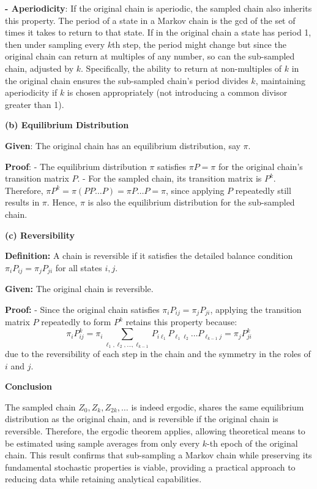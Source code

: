 \documentclass[8pt]{article}
\begin{document}
\textbf{- Aperiodicity}: If the original chain is aperiodic, the sampled chain also inherits this property. The period of a state in a Markov chain is the gcd of the set of times it takes to return to that state. If in the original chain a state has period 1, then under sampling every \(k\)th step, the period might change but since the original chain can return at multiples of any number, so can the sub-sampled chain, adjusted by \(k\). Specifically, the ability to return at non-multiples of \(k\) in the original chain ensures the sub-sampled chain's period divides \(k\), maintaining aperiodicity if \(k\) is chosen appropriately (not introducing a common divisor greater than 1).

\textbf{(b) Equilibrium Distribution}

\textbf{Given}: The original chain has an equilibrium distribution, say \(\pi\).

\textbf{Proof}:
- The equilibrium distribution \(\pi\) satisfies \(\pi P = \pi\) for the original chain's transition matrix \(P\).
- For the sampled chain, its transition matrix is \(P^k\). Therefore, \(\pi P^k = \pi (P P \ldots P) = \pi P \ldots P = \pi\), since applying \(P\) repeatedly still results in \(\pi\). Hence, \(\pi\) is also the equilibrium distribution for the sub-sampled chain.

\textbf{(c) Reversibility}

\textbf{Definition:} A chain is reversible if it satisfies the detailed balance condition \(\pi_i P_{ij} = \pi_j P_{ji}\) for all states \(i, j\).

\textbf{Given:} The original chain is reversible.

\textbf{Proof:}
- Since the original chain satisfies \(\pi_i P_{ij} = \pi_j P_{ji}\), applying the transition matrix \(P\) repeatedly to form \(P^k\) retains this property because:
  \[
  \pi_i P^k_{ij} = \pi_i \sum_{\ell_1, \ell_2, \ldots, \ell_{k-1}} P_{i\ell_1} P_{\ell_1\ell_2} \ldots P_{\ell_{k-1}j} = \pi_j P^k_{ji}
  \]
  due to the reversibility of each step in the chain and the symmetry in the roles of \(i\) and \(j\).

\textbf{Conclusion}

The sampled chain \(Z_0, Z_k, Z_{2k}, \ldots\) is indeed ergodic, shares the same equilibrium distribution as the original chain, and is reversible if the original chain is reversible. Therefore, the ergodic theorem applies, allowing theoretical means to be estimated using sample averages from only every \(k\)-th epoch of the original chain. This result confirms that sub-sampling a Markov chain while preserving its fundamental stochastic properties is viable, providing a practical approach to reducing data while retaining analytical capabilities.
\end{document}
